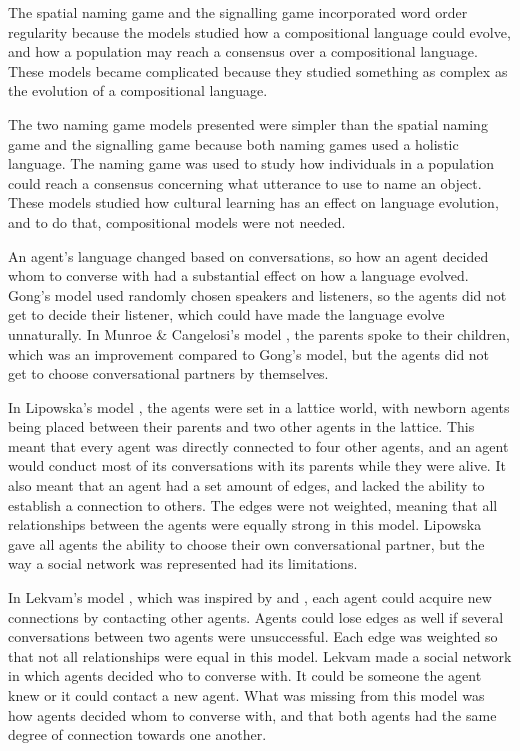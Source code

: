 The spatial naming game and the signalling game incorporated word order regularity because the models studied how a compositional language could evolve, and how a population may reach a consensus over a compositional language. These models became complicated because they studied something as complex as the evolution of a compositional language. 

The two naming game models presented were simpler than the spatial naming game and the signalling game because both naming games used a holistic language. The naming game was used to study how individuals in a population could reach a consensus concerning what utterance to use to name an object. These models studied how cultural learning has an effect on language evolution, and to do that, compositional models were not needed. 

An agent’s language changed based on conversations, so how an agent decided whom to converse with had a substantial effect on how a language evolved. Gong’s model \citep{gong2011simulating} used randomly chosen speakers and listeners, so the agents did not get to decide their listener, which could have made the language evolve unnaturally. In Munroe \& Cangelosi’s model \citep{munroe2002learning}, the parents spoke to their children, which was an improvement compared to Gong’s model, but the agents did not get to choose conversational partners by themselves.

In Lipowska’s model \citep{lipowska2011naming}, the agents were set in a lattice world, with newborn agents being placed between their parents and two other agents in the lattice. This meant that every agent was directly connected to four other agents, and an agent would conduct most of its conversations with its parents while they were alive. It also meant that an agent had a set amount of edges, and lacked the ability to establish a connection to others. The edges were not weighted, meaning that all relationships between the agents were equally strong in this model. Lipowska gave all agents the ability to choose their own conversational partner, but the way a social network was represented had its limitations. 

In Lekvam’s model \citep{lekvam2014co}, which was inspired by \citet{lipowska2011naming} and \citet{quillinan2006social}, each agent could acquire new connections by contacting other agents. Agents could lose edges as well if several conversations between two agents were unsuccessful. Each edge was weighted so that not all relationships were equal in this model. Lekvam made a social network in which agents decided who to converse with. It could be someone the agent knew or it could contact a new agent. What was missing from this model was how agents decided whom to converse with, and that both agents had the same degree of connection towards one another. 

